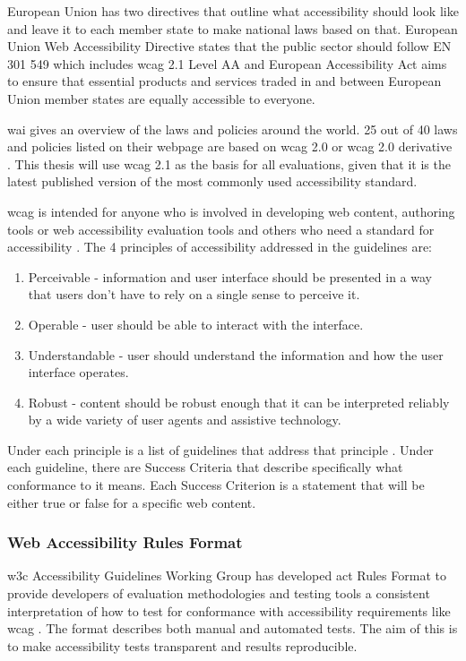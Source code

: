\documentclass{master_thesis}
\begin{document}
European Union has two directives that outline what accessibility should look like and leave it to each member state to make national laws based on that. European Union Web Accessibility Directive states that the public sector should follow EN 301 549 which includes \ac{wcag} 2.1 Level AA and European Accessibility Act aims to ensure that essential products and services traded in and between European Union member states are equally accessible to everyone.

\ac{wai} gives an overview of the laws and policies around the world. 25 out of 40 laws and policies listed on their webpage are based on \ac{wcag} 2.0 or \ac{wcag} 2.0 derivative \citep{Mueller2018}. This thesis will use \ac{wcag} 2.1 as the basis for all evaluations, given that it is the latest published version of the most commonly used accessibility standard.

\ac{wcag} is intended for anyone who is involved in developing web content, authoring tools or web accessibility evaluation tools and others who need a standard for accessibility \citep{Henry2023}. The 4 principles of accessibility addressed in the guidelines are:
\begin{enumerate}
	\item Perceivable - information and user interface should be presented in a way that users don't have to rely on a single sense to perceive it.
	\item Operable - user should be able to interact with the interface.
	\item Understandable - user should understand the information and how the user interface operates.
	\item Robust - content should be robust enough that it can be interpreted reliably by a wide variety of user agents and assistive technology.
\end{enumerate}
Under each principle is a list of guidelines that address that principle \citep{AGWGWP2022}. Under each guideline, there are Success Criteria that describe specifically what conformance to it means. Each Success Criterion is a statement that will be either true or false for a specific web content.

\subsubsection{Web Accessibility Rules Format}

\ac{w3c} Accessibility Guidelines Working Group has developed \ac{act} Rules Format to provide developers of evaluation methodologies and testing tools a consistent interpretation of how to test for conformance with accessibility requirements like \ac{wcag} \citep{Fiers2019}. The format describes both manual and automated tests. The aim of this is to make accessibility tests transparent and results reproducible.
\end{document}
